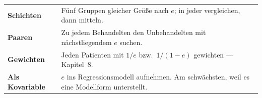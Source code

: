 \begin{merksatz}
\begin{center}
{\small
\renewcommand{\arraystretch}{1.55}
\begin{tabular}{@{}P{2.4cm}P{6.2cm}@{}}
\toprule
\textbf{Schichten} & Fünf Gruppen gleicher Größe nach $e$; in jeder vergleichen, dann mitteln.\\
\textbf{Paaren} & Zu jedem Behandelten den Unbehandelten mit nächstliegendem $e$ suchen.\\
\textbf{Gewichten} & Jeden Patienten mit $1/e$ bzw.\ $1/(1-e)$ gewichten --- Kapitel~8.\\
\textbf{Als Kovariable} & $e$ ins Regressionsmodell aufnehmen. \textcolor{akzent}{Am schwächsten}, weil es eine Modellform unterstellt.\\
\bottomrule
\end{tabular}}
\end{center}
\end{merksatz}


